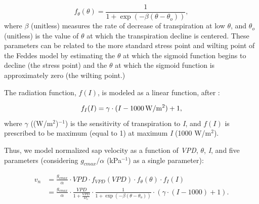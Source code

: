 \begin{equation}  %
\label{eqn:sapflow_soilmois}
f_{\theta}(\theta) = \frac{1}{1+\exp(-\beta(\theta-\theta_o))},
\end{equation}
where $\beta$ (unitless) measures the rate of decrease of transpiration at low $\theta$, and $\theta_o$ (unitless) is the value of $\theta$ at which the transpiration decline is centered.  These parameters can be related to the more standard stress point and wilting point of the Feddes model by estimating the $\theta$ at which the sigmoid function begins to decline (the stress point) and the $\theta$ at which the sigmoid function is approximately zero (the wilting point.)

The radiation function, $f(I)$, is modeled as a linear function, after \cite{waring2011generalizing}:

\begin{equation}  %
f_I(I) = \gamma \cdot (I-1000 \, {\rm W/m^2})+1,
\end{equation}
where $\gamma$ ((W/m$^2$)$^{-1}$) is the sensitivity of transpiration to \textit{I}, and $f(I)$ is prescribed to be maximum (equal to 1) at maximum \textit{I} (1000 W/m$^2$).

Thus, we model normalized sap velocity as a function of \textit{VPD}, $\theta$, \textit{I}, and five parameters (considering $g_{cmax}/\alpha$ (kPa$^{-1}$) as a single parameter):

\begin{align}
\label{eqn:sapflow_jarvis}
v_n & =  \frac{g_{cmax}}{\alpha} \cdot VPD \cdot f_{VPD}(VPD) \cdot f_{\theta}(\theta) \cdot f_I(I) \nonumber \\ 
& =  \frac{g_{cmax}}{\alpha} \cdot \frac{VPD}{1+\frac{VPD}{D_o}} \cdot \frac{1}{1+\exp(-\beta(\theta-\theta_o))} \cdot (\gamma \cdot (I-1000)+1).
\end{align}

